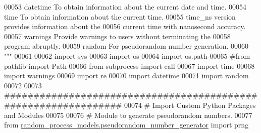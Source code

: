 \begin{DoxyCode}
00053 \textcolor{stringliteral}{    datetime    To obtain information about the current date and time.}
00054 \textcolor{stringliteral}{    time        To obtain information about the current time.}
00055 \textcolor{stringliteral}{                time\_ns version provides information about the}
00056 \textcolor{stringliteral}{                    current time with nanosecond accuracy.}
00057 \textcolor{stringliteral}{    warnings    Provide warnings to users without terminating the}
00058 \textcolor{stringliteral}{                    program abruptly.}
00059 \textcolor{stringliteral}{    random      For pseudorandom number generation.}
00060 \textcolor{stringliteral}{"""}
00061 
00062 \textcolor{keyword}{import} sys
00063 \textcolor{keyword}{import} os
00064 \textcolor{keyword}{import} os.path
00065 \textcolor{comment}{#from pathlib import Path}
00066 \textcolor{keyword}{from} subprocess \textcolor{keyword}{import} call
00067 \textcolor{keyword}{import} time
00068 \textcolor{keyword}{import} warnings
00069 \textcolor{keyword}{import} re
00070 \textcolor{keyword}{import} datetime
00071 \textcolor{keyword}{import} random
00072 
00073 \textcolor{comment}{###############################################################}
00074 \textcolor{comment}{#   Import Custom Python Packages and Modules}
00075 
00076 \textcolor{comment}{# Module to generate pseudorandom numbers.}
00077 \textcolor{keyword}{from} \hyperlink{namespacerandom__process__models_1_1pseudorandom__number__generator}{random\_process\_models.pseudorandom\_number\_generator}
       \textcolor{keyword}{import} prng
\end{DoxyCode}
